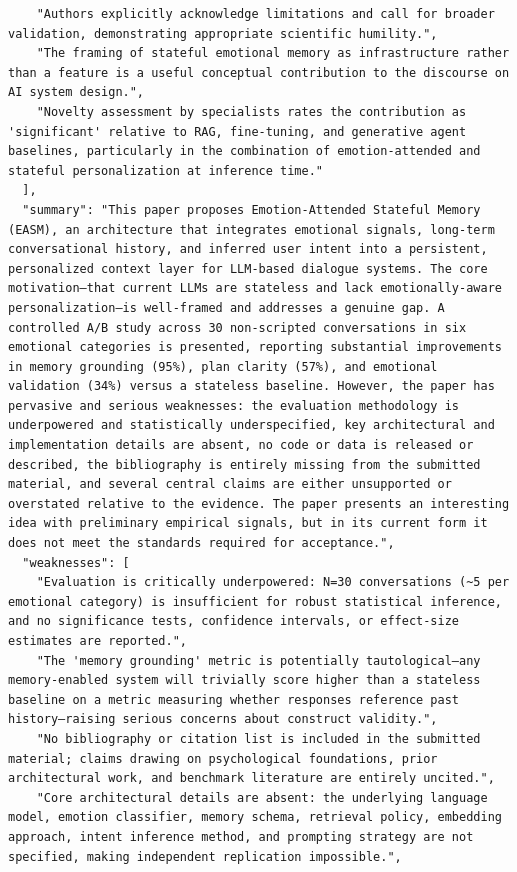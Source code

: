 \documentclass[11pt]{article}
\begin{document}
\begin{verbatim}
    "Authors explicitly acknowledge limitations and call for broader validation, demonstrating appropriate scientific humility.",
    "The framing of stateful emotional memory as infrastructure rather than a feature is a useful conceptual contribution to the discourse on AI system design.",
    "Novelty assessment by specialists rates the contribution as 'significant' relative to RAG, fine-tuning, and generative agent baselines, particularly in the combination of emotion-attended and stateful personalization at inference time."
  ],
  "summary": "This paper proposes Emotion-Attended Stateful Memory (EASM), an architecture that integrates emotional signals, long-term conversational history, and inferred user intent into a persistent, personalized context layer for LLM-based dialogue systems. The core motivation—that current LLMs are stateless and lack emotionally-aware personalization—is well-framed and addresses a genuine gap. A controlled A/B study across 30 non-scripted conversations in six emotional categories is presented, reporting substantial improvements in memory grounding (95%), plan clarity (57%), and emotional validation (34%) versus a stateless baseline. However, the paper has pervasive and serious weaknesses: the evaluation methodology is underpowered and statistically underspecified, key architectural and implementation details are absent, no code or data is released or described, the bibliography is entirely missing from the submitted material, and several central claims are either unsupported or overstated relative to the evidence. The paper presents an interesting idea with preliminary empirical signals, but in its current form it does not meet the standards required for acceptance.",
  "weaknesses": [
    "Evaluation is critically underpowered: N=30 conversations (~5 per emotional category) is insufficient for robust statistical inference, and no significance tests, confidence intervals, or effect-size estimates are reported.",
    "The 'memory grounding' metric is potentially tautological—any memory-enabled system will trivially score higher than a stateless baseline on a metric measuring whether responses reference past history—raising serious concerns about construct validity.",
    "No bibliography or citation list is included in the submitted material; claims drawing on psychological foundations, prior architectural work, and benchmark literature are entirely uncited.",
    "Core architectural details are absent: the underlying language model, emotion classifier, memory schema, retrieval policy, embedding approach, intent inference method, and prompting strategy are not specified, making independent replication impossible.",

\end{verbatim}
\end{document}
